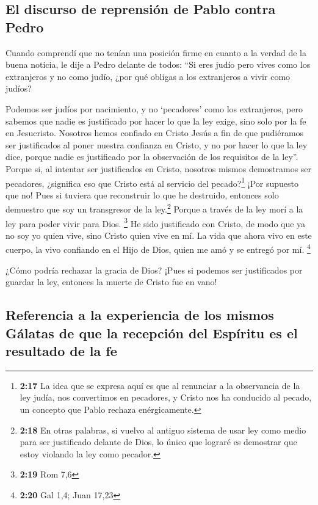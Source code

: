 \hypertarget{el-discurso-de-reprensiuxf3n-de-pablo-contra-pedro}{%
\subsection{El discurso de reprensión de Pablo contra
Pedro}\label{el-discurso-de-reprensiuxf3n-de-pablo-contra-pedro}}

 Cuando comprendí que no tenían una posición firme en
cuanto a la verdad de la buena noticia, le dije a Pedro delante de
todos: ``Si eres judío pero vives como los extranjeros y no como judío,
¿por qué obligas a los extranjeros a vivir como judíos?

 Podemos ser judíos por nacimiento, y no `pecadores' como
los extranjeros,  pero sabemos que nadie es justificado
por hacer lo que la ley exige, sino solo por la fe en Jesucristo.
Nosotros hemos confiado en Cristo Jesús a fin de que pudiéramos ser
justificados al poner nuestra confianza en Cristo, y no por hacer lo que
la ley dice, porque nadie es justificado por la observación de los
requisitos de la ley''.  Porque si, al intentar ser
justificados en Cristo, nosotros mismos demostramos ser pecadores,
¿significa eso que Cristo está al servicio del pecado?\footnote{\textbf{2:17}
  La idea que se expresa aquí es que al renunciar a la observancia de la
  ley judía, nos convertimos en pecadores, y Cristo nos ha conducido al
  pecado, un concepto que Pablo rechaza enérgicamente.} ¡Por supuesto
que no!  Pues si tuviera que reconstruir lo que he
destruido, entonces solo demuestro que soy un transgresor de la
ley.\footnote{\textbf{2:18} En otras palabras, si vuelvo al antiguo
  sistema de usar ley como medio para ser justificado delante de Dios,
  lo único que lograré es demostrar que estoy violando la ley como
  pecador.}  Porque a través de la ley morí a la ley para
poder vivir para Dios. \footnote{\textbf{2:19} Rom 7,6} 
He sido justificado con Cristo, de modo que ya no soy yo quien vive,
sino Cristo quien vive en mí. La vida que ahora vivo en este cuerpo, la
vivo confiando en el Hijo de Dios, quien me amó y se entregó por mí.
\footnote{\textbf{2:20} Gal 1,4; Juan 17,23}

 ¿Cómo podría rechazar la gracia de Dios? ¡Pues si
podemos ser justificados por guardar la ley, entonces la muerte de
Cristo fue en vano!

\hypertarget{referencia-a-la-experiencia-de-los-mismos-guxe1latas-de-que-la-recepciuxf3n-del-espuxedritu-es-el-resultado-de-la-fe}{%
\subsection{Referencia a la experiencia de los mismos Gálatas de que la
recepción del Espíritu es el resultado de la
fe}\label{referencia-a-la-experiencia-de-los-mismos-guxe1latas-de-que-la-recepciuxf3n-del-espuxedritu-es-el-resultado-de-la-fe}}

